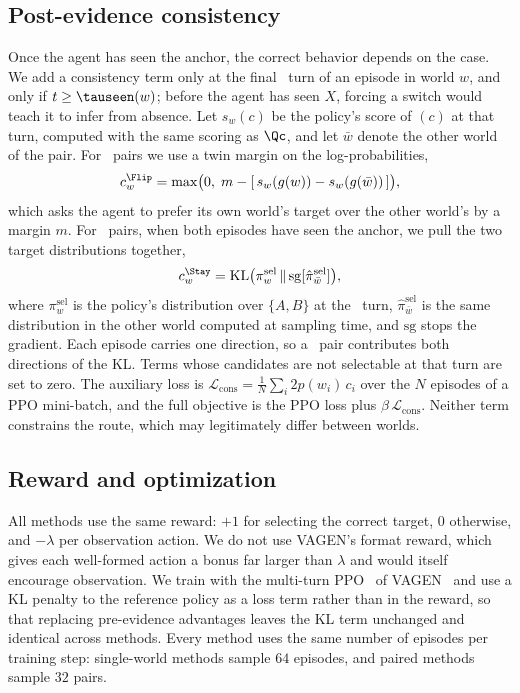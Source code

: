 \subsection{Post-evidence consistency}
\label{sec:consistency}
Once the agent has seen the anchor, the correct behavior depends on the case.
We add a consistency term only at the final \commit\ turn of an episode in world $w$, and only if $t \ge \tauseen(w)$; before the agent has seen $X$, forcing a switch would teach it to infer from absence.
Let $s_w(c)$ be the policy's score of \commit$(c)$ at that turn, computed with the same scoring as $\Qc$, and let $\bar w$ denote the other world of the pair.
For \Flip\ pairs we use a twin margin on the log-probabilities,
\begin{equation}
c_w^{\Flip} = \max\!\big(0,\; m - [\, s_w(g(w)) - s_w(g(\bar w)) \,]\big),
\end{equation}
which asks the agent to prefer its own world's target over the other world's by a margin $m$.
For \Stay\ pairs, when both episodes have seen the anchor, we pull the two target distributions together,
\begin{equation}
c_w^{\Stay} = \mathrm{KL}\big(\pi^{\mathrm{sel}}_w \,\|\, \mathrm{sg}[\hat\pi^{\mathrm{sel}}_{\bar w}]\big),
\end{equation}
where $\pi^{\mathrm{sel}}_w$ is the policy's distribution over $\{A, B\}$ at the \commit\ turn, $\hat\pi^{\mathrm{sel}}_{\bar w}$ is the same distribution in the other world computed at sampling time, and $\mathrm{sg}$ stops the gradient.
Each episode carries one direction, so a \Stay\ pair contributes both directions of the KL.
Terms whose candidates are not selectable at that turn are set to zero.
The auxiliary loss is $\mathcal{L}_{\mathrm{cons}} = \frac{1}{N}\sum_i 2p(w_i)\, c_i$ over the $N$ episodes of a PPO mini-batch, and the full objective is the PPO loss plus $\beta\, \mathcal{L}_{\mathrm{cons}}$.
Neither term constrains the route, which may legitimately differ between worlds.

\subsection{Reward and optimization}
\label{sec:training}
All methods use the same reward: $+1$ for selecting the correct target, $0$ otherwise, and $-\lambda$ per observation action.
We do not use VAGEN's format reward, which gives each well-formed action a bonus far larger than $\lambda$ and would itself encourage observation.
We train with the multi-turn PPO~\cite{ppo2017} of VAGEN~\cite{vagen2025} and use a KL penalty to the reference policy as a loss term rather than in the reward, so that replacing pre-evidence advantages leaves the KL term unchanged and identical across methods.
Every method uses the same number of episodes per training step: single-world methods sample $64$ episodes, and paired methods sample $32$ pairs.
